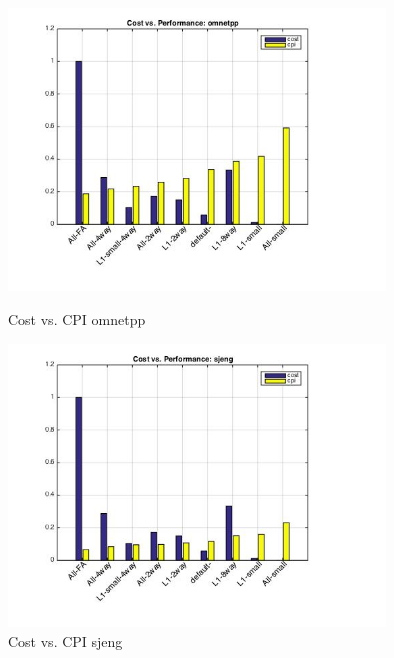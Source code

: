 \documentclass[11pt,titlepage]{article}
\begin{document}
\begin{figure}[H]
  \centering
  \begin{minipage}{.5\textwidth}
    \centering
    \includegraphics[width=10cm]{cvpomnetpp}
    \caption{Cost vs. CPI omnetpp}
    \label{fig:cvomnetpp}
  \end{minipage}%
  \begin{minipage}{.5\textwidth}
    \centering
    \includegraphics[width=10cm]{cvpsjeng}
    \caption{Cost vs. CPI sjeng}
    \label{fig:cvpsjeng}
  \end{minipage}
\end{figure}
\end{document}

